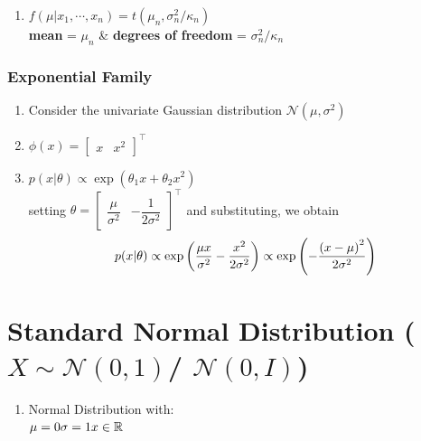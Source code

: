 \begin{enumerate}[itemsep=0.2cm]
\begin{enumerate}[itemsep=0.2cm]
\begin{enumerate}[itemsep=0.2cm]
            \item $
                f(\mu|x_1,\cdots,x_n) 
                = t(\mu_n,\sigma_n^2/\kappa_n)
            $ \\[2ex]
            \textbf{mean} = $\mu_n$   \& 
            \textbf{degrees of freedom} = $\sigma_n^2/\kappa_n$

        \end{enumerate}

    \end{enumerate}

\end{enumerate}


\subsubsection{Exponential Family \cite{mfml-1}} \label{Normal distribution: Bivariate/ Multivariate: Exponential Family}

\begin{enumerate}
    \item Consider the univariate Gaussian distribution $\mathcal{N}(\mu, \sigma^2)$
    
    \item $\phi(x) = \begin{bmatrix} x & x^2 \end{bmatrix}^\top$

    \item $p(x | \theta) \propto \exp(\theta_1x + \theta_2x^2)$\\[1ex]
    setting $\theta = \begin{bmatrix}
        \dfrac{\mu}{\sigma^2} &
        -\dfrac{1}{2\sigma^2}
    \end{bmatrix}^\top$ and substituting, we obtain
    \[
        p(x|\theta)
        \propto \exp\left(
            \dfrac{\mu x}{\sigma^2}
            -\dfrac{x^2}{2\sigma^2}
        \right) 
        \propto \exp\left(
            -\dfrac{\left(x - \mu\right)^2}{2\sigma^2}
        \right) 
    \]
    

\end{enumerate}


\section{Standard Normal Distribution ($X \sim \mathcal{N}(0,1)$/ $\mathcal{N}(0, I)$) \cite{ism-1,mfml-1}} \label{Standard Normal Distribution}

\begin{enumerate}
    \item Normal Distribution with: \\
    $
        \hfill
        \mu = 0
        \hfill
        \sigma = 1
        \hfill
        x \in \mathbb{R}
    $
\end{enumerate}


